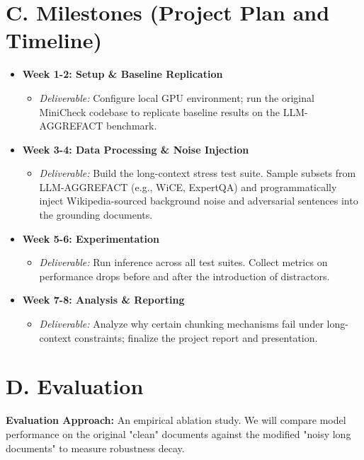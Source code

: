 \documentclass[12pt, letterpaper]{article}
\begin{document}
\section*{C. Milestones (Project Plan and Timeline)}

\begin{itemize}[leftmargin=*]
    \item \textbf{Week 1-2: Setup \& Baseline Replication} 
    \begin{itemize}
        \item \textit{Deliverable:} Configure local GPU environment; run the original MiniCheck codebase to replicate baseline results on the LLM-AGGREFACT benchmark.
    \end{itemize}
    \item \textbf{Week 3-4: Data Processing \& Noise Injection}
    \begin{itemize}
        \item \textit{Deliverable:} Build the long-context stress test suite. Sample subsets from LLM-AGGREFACT (e.g., WiCE, ExpertQA) and programmatically inject Wikipedia-sourced background noise and adversarial sentences into the grounding documents.
    \end{itemize}
    \item \textbf{Week 5-6: Experimentation}
    \begin{itemize}
        \item \textit{Deliverable:} Run inference across all test suites. Collect metrics on performance drops before and after the introduction of distractors.
    \end{itemize}
    \item \textbf{Week 7-8: Analysis \& Reporting}
    \begin{itemize}
        \item \textit{Deliverable:} Analyze why certain chunking mechanisms fail under long-context constraints; finalize the project report and presentation.
    \end{itemize}
\end{itemize}

\section*{D. Evaluation}

\textbf{Evaluation Approach:} An empirical ablation study. We will compare model performance on the original "clean" documents against the modified "noisy long documents" to measure robustness decay.
\end{document}
